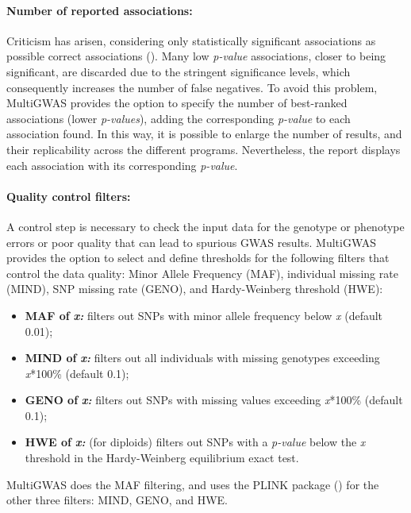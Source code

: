 \documentclass{article}
\begin{document}
\paragraph{Number of reported associations: }

Criticism has arisen, considering only statistically significant associations as possible correct associations (\cite{Thomson2011, Kaler2019}). Many low \emph{p-value} associations, closer to being significant, are discarded due to the stringent significance levels, which consequently increases the number of false negatives. To avoid this problem, MultiGWAS provides the option to specify the number of best-ranked associations (lower \emph{p-values}), adding the corresponding \emph{p-value} to each association found. In this way, it is possible to enlarge the number of results, and their replicability across the different programs. Nevertheless, the report displays each association with its corresponding \emph{p-value}.


\paragraph{Quality control filters:}

A control step is necessary to check the input data for the genotype or phenotype errors or poor quality that can lead to spurious GWAS results. MultiGWAS provides the option to select and define thresholds for the following filters that control the data quality: Minor Allele Frequency (MAF), individual missing rate (MIND), SNP missing rate (GENO), and Hardy-Weinberg threshold (HWE):
\begin{itemize}
\item \textbf{MAF of }\textbf{\emph{x:}} filters out SNPs with minor allele frequency below \emph{x} (default 0.01); 
\item \textbf{MIND of }\textbf{\emph{x:}} filters out all individuals with missing genotypes exceeding \emph{x}{*}100\% (default 0.1); 
\item \textbf{GENO of }\textbf{\emph{x:}} filters out SNPs with missing values exceeding \emph{x}{*}100\% (default 0.1); 
\item \textbf{HWE of }\textbf{\emph{x:}} (for diploids) filters out SNPs with a \emph{p-value} below the \emph{x} threshold in the Hardy-Weinberg equilibrium exact test.

\end{itemize}
MultiGWAS does the MAF filtering, and uses the PLINK package (\cite{Gumpinger2018}) for the other three filters: MIND, GENO, and HWE.
\end{document}
